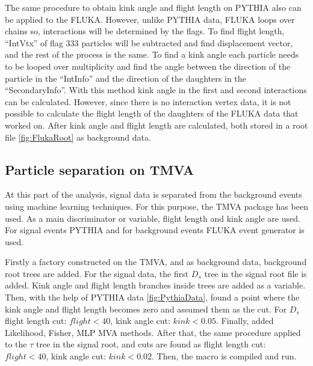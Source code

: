 \documentclass[12pt]{report}
\begin{document}
The same procedure to obtain kink angle and flight length on PYTHIA also can be applied to the FLUKA. However, unlike PYTHIA data, FLUKA loops over chains so, interactions will be determined by the flags. To find flight length, “IntVtx” of flag 333 particles will be subtracted and find displacement vector, and the rest of the process is the same. To find a kink angle each particle needs to be looped over multiplicity and find the angle between the direction of the particle in the “IntInfo” and the direction of the daughters in the “SecondaryInfo”. With this method kink angle in the first and second interactions can be calculated. However, since there is no interaction vertex data, it is not possible to calculate the flight length of the daughters of the FLUKA data that worked on. After kink angle and flight length are calculated, both stored in a root file \ref{fig:FlukaRoot} as background data.

\subsection{Particle separation on TMVA}

At this part of the analysis, signal data is separated from the background events using machine learning techniques. For this purpose, the TMVA package has been used. As a main discriminator or variable, flight length and kink angle are used. For signal events PYTHIA and for background events FLUKA event generator is used.

Firstly a factory constructed on the TMVA, and as background data, background root trees are added. For the signal data, the first $D_s$ tree in the signal root file is added. Kink angle and flight length branches inside trees are added as a variable. Then, with the help of PYTHIA data \ref{fig:PythiaData}, found a point where the kink angle and flight length becomes zero and assumed them as the cut. For $D_s$ flight length cut: $flight < 40$, kink angle cut: $kink < 0.05$. Finally, added Likelihood, Fisher, MLP MVA methods. After that, the same procedure applied to the $\tau$ tree in the signal root, and cuts are found as flight length cut: $flight < 40$, kink angle cut: $kink < 0.02$. Then, the macro is compiled and run. 
\end{document}
